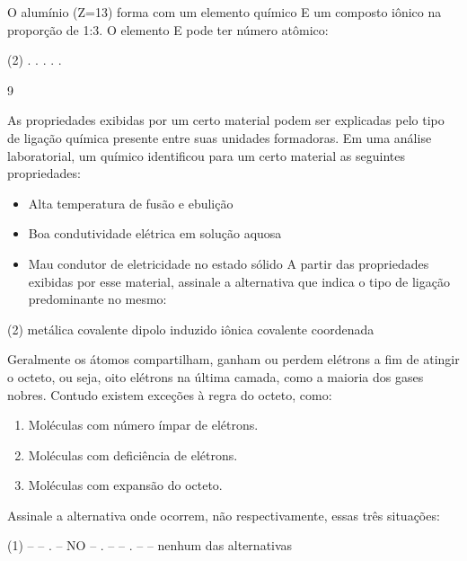 \documentclass[9qpt]{scrartcl}
\begin{document}
\begin{exercise}[points=1.0]
O alumínio (Z=13) forma com um elemento químico E um composto iônico na proporção de 1:3. O elemento E pode ter número atômico:

\begin{choice}(2)
.
.
.
.
.
\end{choice}
\end{exercise}
\begin{solution}
9
\end{solution}



\begin{exercise}[points=1.0]
As propriedades exibidas por um certo material podem ser explicadas pelo tipo de ligação química presente entre suas unidades formadoras. Em uma análise laboratorial, um químico identificou para um certo material as seguintes propriedades:
\begin{itemize}
\item Alta temperatura de fusão e ebulição
\item Boa condutividade elétrica em solução aquosa
\item Mau condutor de eletricidade no estado sólido
A partir das propriedades exibidas por esse material, assinale a alternativa que indica o tipo de ligação predominante no mesmo:
\end{itemize}
\begin{choice}(2)
\choice metálica
\choice covalente
\choice dipolo induzido
\choice iônica
\choice covalente coordenada
\end{choice}
\end{exercise}




\begin{exercise}[points=1.0]
Geralmente os átomos compartilham, ganham ou perdem elétrons a fim de atingir o octeto, ou seja, oito elétrons na última camada, como a maioria dos gases nobres. Contudo existem exceções à regra do octeto, como:

\begin{enumerate}
\item Moléculas com número ímpar de elétrons.
\item Moléculas com deficiência de elétrons.
\item Moléculas com expansão do octeto.
\end{enumerate}

Assinale a alternativa onde ocorrem, não respectivamente, essas três situações:
\begin{choice}(1)
\choice  {} –  – .
\choice  {} – NO – .
\choice  {} –  – .
\choice  {} –  – 
\choice  nenhum das alternativas
\end{choice}
\end{exercise}
\end{document}
